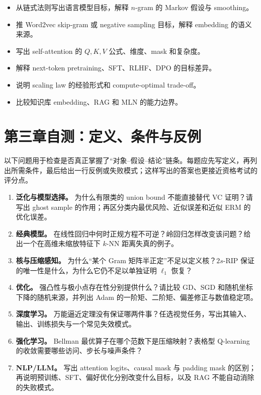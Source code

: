\begin{itemize}
  \item 从链式法则写出语言模型目标，解释 \(n\)-gram 的 Markov 假设与 smoothing。
  \item 推 Word2vec skip-gram 或 negative sampling 目标，解释 embedding 的语义来源。
  \item 写出 self-attention 的 \(Q,K,V\) 公式、维度、mask 和复杂度。
  \item 解释 next-token pretraining、SFT、RLHF、DPO 的目标差异。
  \item 说明 scaling law 的经验形式和 compute-optimal trade-off。
  \item 比较知识库 embedding、RAG 和 MLN 的能力边界。
\end{itemize}

\section{第三章自测：定义、条件与反例}

以下问题用于检查是否真正掌握了“对象--假设--结论”链条。每题应先写定义，再列出所需条件，最后给出一行反例或失败模式；这样写出的答案也更接近资格考试的评分点。

\begin{enumerate}
  \item \textbf{泛化与模型选择。} 为什么有限类的 union bound 不能直接替代 VC 证明？请写出 ghost sample 的作用；再区分类内最优风险、近似误差和近似 ERM 的优化误差。
  \item \textbf{经典模型。} 在线性回归中何时正规方程不可逆？岭回归怎样改变该问题？给出一个在高维未缩放特征下 \(k\)-NN 距离失真的例子。
  \item \textbf{核与压缩感知。} 为什么“某个 Gram 矩阵半正定”不足以定义核？\(2s\)-RIP 保证的唯一性是什么，为什么它仍不足以单独证明 \(\ell_1\) 恢复？
  \item \textbf{优化。} 强凸性与极小点存在性分别提供什么？请比较 GD、SGD 和随机坐标下降的随机来源，并列出 Adam 的一阶矩、二阶矩、偏差修正与数值稳定项。
  \item \textbf{深度学习。} 万能逼近定理没有保证哪两件事？任选视觉任务，写出其输入、输出、训练损失与一个常见失效模式。
  \item \textbf{强化学习。} Bellman 最优算子在哪个范数下是压缩映射？表格型 Q-learning 的收敛需要哪些访问、步长与噪声条件？
  \item \textbf{NLP/LLM。} 写出 attention logits、causal mask 与 padding mask 的区别；再说明预训练、SFT、偏好优化分别改变什么目标，以及 RAG 不能自动消除的失败模式。
\end{enumerate}

